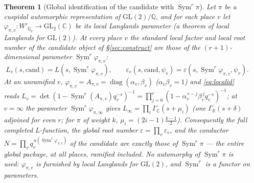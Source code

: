 \documentclass[11pt]{article}
\newtheorem{theorem}{Theorem}
\theoremstyle{definition}
\newcommand{\Sym}{\operatorname{Sym}}
\begin{document}
\begin{theorem}[Global identification of the candidate with $\Sym^r\pi$]\label{prop:localid}
Let $\pi$ be a cuspidal automorphic representation of $\mathrm{GL}(2)/\mathbb Q$, and for each place $v$
let $\varphi_{\pi,v}\colon W'_{\mathbb Q_v}\to\mathrm{GL}_2(\mathbb C)$ be its local Langlands parameter
(a theorem of local Langlands for $\mathrm{GL}(2)$). At \emph{every} place $v$ the standard local factor
and local root number of the candidate object of \S\ref{sec:construct} are those of the $(r{+}1)$-dimen\-sional
parameter $\Sym^r\varphi_{\pi,v}$:
\begin{equation}\label{eq:localid}
  L_v(s,\mathrm{cand})=L\!\left(s,\Sym^r\varphi_{\pi,v}\right),\qquad
  \varepsilon_v(s,\mathrm{cand},\psi_v)=\varepsilon\!\left(s,\Sym^r\varphi_{\pi,v},\psi_v\right).
\end{equation}
At an unramified $v$, $\varphi_{\pi,v}=A_{\pi,v}=\operatorname{diag}(\alpha_v,\beta_v)$ ($\alpha_v\beta_v
=1$) and \eqref{eq:localid} reads $L_v=\det(1-\Sym^r(A_{\pi,v})q_v^{-s})^{-1}=\prod_{j=0}^{r}(1-\alpha_v^{
\,r-j}\beta_v^{\,j}q_v^{-s})^{-1}$; at $v=\infty$ the parameter $\Sym^r\varphi_{\pi,\infty}$ gives
$L_\infty=\prod_i\Gamma_{\mathbb C}(s+\mu_i)$ (one $\Gamma_{\mathbb R}(s+\delta)$ adjoined for even $r$;
for $\pi$ of weight $k$, $\mu_i=(2i{-}1)\tfrac{k-1}2$). Consequently the \emph{full} completed
$L$-function, the global root number $\varepsilon=\prod_v\varepsilon_v$, and the conductor
$N=\prod_v q_v^{\,a(\Sym^r\varphi_{\pi,v})}$ of the candidate are exactly those of $\Sym^r\pi$ --- the
entire global package, at all places, ramified included. No automorphy of $\Sym^r\pi$ is used:
$\varphi_{\pi,v}$ is furnished by local Langlands for $\mathrm{GL}(2)$, and $\Sym^r$ is a functor on
parameters.
\end{theorem}
\end{document}
